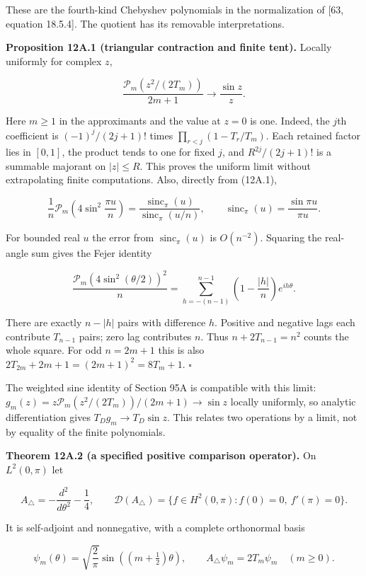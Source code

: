 \documentclass[
  11pt,
]{book}
\begin{document}
These are the fourth-kind Chebyshev polynomials in the normalization of
{[}63, equation 18.5.4{]}. The quotient has its removable
interpretations.

\textbf{Proposition 12A.1 (triangular contraction and finite tent).}
Locally uniformly for complex \(z\),

\[
\boxed{\frac{\mathcal P_m(z^2/(2T_m))}{2m+1}
\longrightarrow\frac{\sin z}{z}.}
\tag{12A.2}
\]

Here \(m\ge1\) in the approximants and the value at \(z=0\) is one.
Indeed, the \(j\)th coefficient is \((-1)^j/(2j+1)!\) times
\(\prod_{r<j}(1-T_r/T_m)\). Each retained factor lies in \([0,1]\), the
product tends to one for fixed \(j\), and \(R^{2j}/(2j+1)!\) is a
summable majorant on \(|z|\le R\). This proves the uniform limit without
extrapolating finite computations. Also, directly from (12A.1),

\[
\frac1n\mathcal P_m\!\left(4\sin^2\frac{\pi u}{n}\right)
=\frac{\operatorname{sinc}_\pi(u)}{\operatorname{sinc}_\pi(u/n)},
\qquad \operatorname{sinc}_\pi(u)=\frac{\sin\pi u}{\pi u}.
\tag{12A.3}
\]

For bounded real \(u\) the error from \(\operatorname{sinc}_\pi(u)\) is
\(O(n^{-2})\). Squaring the real-angle sum gives the Fejer identity

\[
\frac{\mathcal P_m(4\sin^2(\theta/2))^2}{n}
=\sum_{h=-(n-1)}^{n-1}\left(1-\frac{|h|}{n}\right)e^{ih\theta}.
\tag{12A.4}
\]

There are exactly \(n-|h|\) pairs with difference \(h\). Positive and
negative lags each contribute \(T_{n-1}\) pairs; zero lag contributes
\(n\). Thus \(n+2T_{n-1}=n^2\) counts the whole square. For odd
\(n=2m+1\) this is also \(2T_{2m}+2m+1=(2m+1)^2=8T_m+1\). \(\square\)

The weighted sine identity of Section 95A is compatible with this limit:
\(g_m(z)=z\mathcal P_m(z^2/(2T_m))/(2m+1)\to\sin z\) locally uniformly,
so analytic differentiation gives \(T_Dg_m\to T_D\sin z\). This relates
two operations by a limit, not by equality of the finite polynomials.

\textbf{Theorem 12A.2 (a specified positive comparison operator).} On
\(L^2(0,\pi)\) let

\[
 A_\triangle=-\frac{d^2}{d\theta^2}-\frac14,\qquad
 \mathcal D(A_\triangle)=
 \{f\in H^2(0,\pi):f(0)=0,\ f'(\pi)=0\}.
\tag{12A.5}
\]

It is self-adjoint and nonnegative, with a complete orthonormal basis

\[
\psi_m(\theta)=\sqrt{\frac2\pi}\sin((m+\tfrac12)\theta),\qquad
A_\triangle\psi_m=2T_m\psi_m\quad(m\ge0).
\tag{12A.6}
\]
\end{document}
